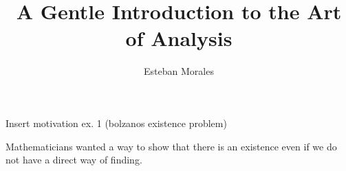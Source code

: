 \documentclass[12pt]{article}
\theoremstyle{definition}
\newenvironment{statement}[2][Section]{\begin{trivlist}
\item[\hskip \labelsep {\bfseries #1}\hskip \labelsep {\bfseries #2.}]}{\end{trivlist}}
\begin{document}
\newtheorem{theorem}{Theorem} 
%
%
 
\title{A Gentle Introduction to the Art of Analysis } %
\author{Esteban Morales} %
\maketitle


\begin{statement}{Chapter 1} %

Insert motivation ex. 1 (bolzanos existence problem)

Mathematicians wanted a way to show that there is an existence even if we do not have a 
direct way of finding.






\end{statement}
 
\end{document}
